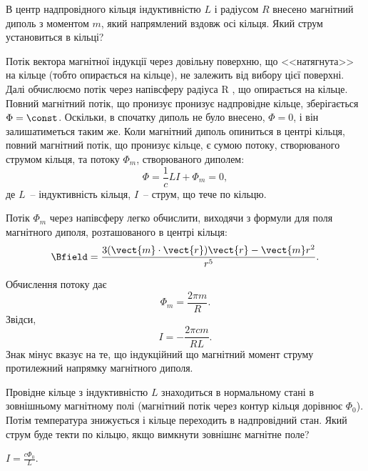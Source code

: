 \begin{problem}
В центр надпровідного кільця індуктивністю $L$ і радіусом $R$ внесено магнітний диполь з моментом $m$, який напрямлений вздовж осі кільця. Який струм установиться в кільці?
\begin{solution}
    Потік вектора магнітної індукції через довільну поверхню, що <<натягнута>> на кільце (тобто опирається на кільце), не залежить від вибору цієї поверхні. Далі обчислюємо потік через напівсферу радіуса R , що опирається на кільце.  Повний магнітний потік, що пронизує пронизує надпровідне кільце, зберігається $\Phi = \const$. Оскільки, в спочатку диполь не було внесено, $\Phi = 0$, і він залишатиметься таким же. Коли магнітний диполь опиниться в центрі кільця, повний магнітний потік, що пронизує кільце, є сумою потоку, створюваного струмом кільця, та потоку $\Phi_m$, створюваного диполем:
	\[
		\Phi = \frac1c LI + \Phi_m = 0,
	\]
	де $L$~-- індуктивність кільця, $I$~-- струм, що тече по кільцю.

Потік $\Phi_m$ через напівсферу легко обчислити, виходячи з формули для поля магнітного диполя, розташованого в центрі кільця: 
\[
    \Bfield = \frac{3(\vect{m}\cdot\vect{r})\vect{r}- \vect{m}r^2}{r^5}.
\]

Обчислення потоку дає
\[
  \Phi_m = \frac{2\pi m}{R} .
\]
%
%
%
	Звідси,
	\[
		I = - \frac{ 2\pi c m}{RL}.
	\]
	Знак мінус вказує на те, що індукційний що магнітний момент струму протилежний напрямку магнітного диполя.
\end{solution}
\end{problem}


\begin{problem}
Провідне кільце з індуктивністю $L$ знаходиться в нормальному стані в зовнішньому магнітному полі (магнітний потік через контур кільця дорівнює $\Phi_0$). Потім температура знижується і кільце переходить в надпровідний стан. Який струм буде текти по кільцю, якщо вимкнути зовнішнє магнітне поле?
\begin{solution}
	$I = \frac{c\Phi_0}{L}$.
\end{solution}
\end{problem}

